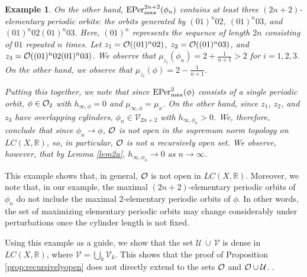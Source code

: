 \documentclass[11pt, reqno]{amsart}
\newtheorem{example}[theorem]{Example}
\newcommand{\EPer}{{\rm EPer}}
\newcommand{\bR}{{\mathbb R}}
\newcommand{\cU}{{\mathcal U}}
\newcommand{\cV}{{\mathcal V}}
\def\EPer{{\rm EPer}}
\begin{document}
\begin{example}
On the other hand, $\EPer_{\max}^{2n+2}(\phi_n)$ contains at least three $(2n+2)$-elementary periodic orbits: the orbits generated by $(01)^n02$, $(01)^n03$, and $(01)^n02(01)^n03$.  Here, $(01)^n$ represents the sequence of length $2n$ consisting of $01$ repeated $n$ times.  Let $z_1=\mathcal O((01)^n02)$, $z_2=\mathcal O((01)^n03)$, and $z_3=\mathcal O((01)^n02(01)^n03)$.  We observe that $\mu_{z_i}(\phi_n)=2+\frac{1}{n+1}>2$ for $i=1,2,3$.  On the other hand, we observe that $\mu_{z_i}(\phi)=2-\frac{1}{n+1}$.  

Putting this together, we note that since $\EPer_{\max}^2(\phi)$ consists of a single periodic orbit, $\phi\in\mathcal O_2$ with $h_{\infty,\phi}=0$ and $\mu_{\infty,\phi}=\mu_x$.  On the other hand, since $z_1$, $z_2$, and $z_3$ have overlapping cylinders, $\phi_n\in\cV_{2n+2}$ with $h_{\infty,\phi_n}>0$.  We, therefore, conclude that since $\phi_n\rightarrow\phi$, $\mathcal O$ is not open in the supremum norm topology on $LC(X,\bR)$, so, in particular, $\mathcal O$ is not a recursively open set.  We observe, however, that by Lemma \ref{lem2a}, $h_{\infty,\phi_n}\rightarrow 0$ as $n\to\infty$.
\end{example}
This example shows that, in general, $\mathcal O$ is not open in $LC(X,\bR)$.  Moreover, we note that, in our example, the maximal $(2n+2)$-elementary periodic orbits of $\phi_n$ do not include the maximal $2$-elementary periodic orbits of $\phi$.  In other words, the set of maximizing elementary periodic orbits may change considerably under perturbations once the cylinder length is not fixed.  

Using this example as a guide, we show that the set $\cU\,\dot\cup\,\cV$ is dense in $LC(X,\bR)$, where $\cV=\bigcup_k\cV_k$.  This shows that the proof of Proposition \ref{prop:recursivelyopen} does not directly extend to the sets $\mathcal O$ and $\cO\cup\cU$.  .
\end{document}

